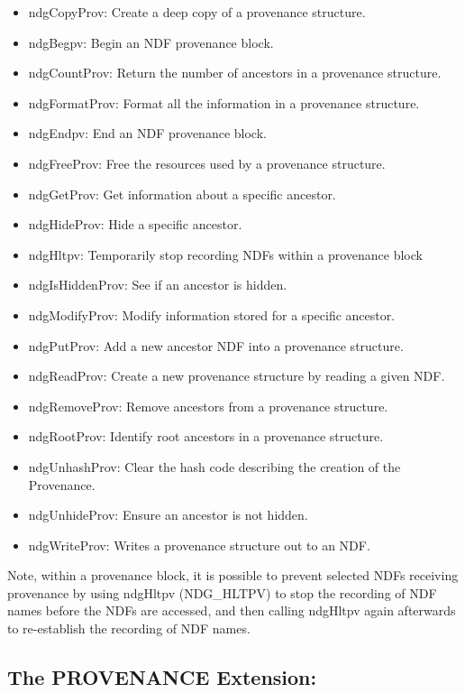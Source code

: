 \documentclass[twoside,11pt,nolof]{starlink}
\begin{document}
\begin{itemize}
   \item  ndgCopyProv: Create a deep copy of a provenance structure.
   \item  ndgBegpv: Begin an NDF provenance block.
   \item  ndgCountProv: Return the number of ancestors in a provenance structure.
   \item  ndgFormatProv: Format all the information in a provenance structure.
   \item  ndgEndpv: End an NDF provenance block.
   \item  ndgFreeProv: Free the resources used by a provenance structure.
   \item  ndgGetProv: Get information about a specific ancestor.
   \item  ndgHideProv: Hide a specific ancestor.
   \item  ndgHltpv: Temporarily stop recording NDFs within a provenance block
   \item  ndgIsHiddenProv: See if an ancestor is hidden.
   \item  ndgModifyProv: Modify information stored for a specific ancestor.
   \item  ndgPutProv: Add a new ancestor NDF into a provenance structure.
   \item  ndgReadProv: Create a new provenance structure by reading a given NDF.
   \item  ndgRemoveProv: Remove ancestors from a provenance structure.
   \item  ndgRootProv: Identify root ancestors in a provenance structure.
   \item  ndgUnhashProv: Clear the hash code describing the creation of the Provenance.
   \item  ndgUnhideProv: Ensure an ancestor is not hidden.
   \item  ndgWriteProv: Writes a provenance structure out to an NDF.
\end{itemize}

Note, within a provenance block, it is possible to prevent selected NDFs
receiving provenance by using ndgHltpv (NDG\_HLTPV) to stop the recording
of NDF names before the NDFs are accessed, and then calling ndgHltpv
again afterwards to re-establish the recording of NDF names.

\subsection{The PROVENANCE Extension:}
\end{document}
